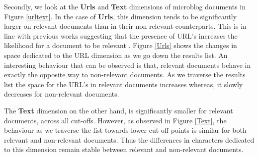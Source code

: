 %






%

%


%


%




Secondly, we look at the \textbf{Urls} and \textbf{Text} dimensions of microblog documents in Figure \ref{urltext}. In the case of \textbf{Urls}, this dimension tends to be significantly larger on relevant documents than in their non-relevant counterparts. This is in line with previous works suggesting that the presence of URL's increases the likelihood for a document to be relevant \cite{massoudi2011incorporating}. Figure \ref{Urls} shows the changes in space dedicated to the URL dimension as we go down the results list. An interesting behaviour that can be observed is that, relevant documents behave in exactly the opposite way to non-relevant documents. As we traverse the results list the space for the URL's in relevant documents increases whereas, it slowly decreases for non-relevant documents.



The \textbf{Text} dimension on the other hand, is significantly smaller for relevant documents, across all cut-offs. However, as observed in Figure \ref{Text}, the behaviour as we traverse the list towards lower cut-off points is similar for both relevant and non-relevant documents. Thus the differences in characters dedicated to this dimension remain stable between relevant and non-relevant documents.



